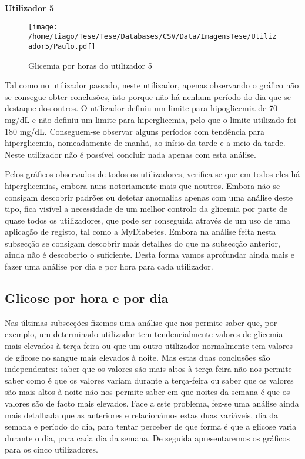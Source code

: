 \textbf{Utilizador 5}

\begin{figure}[H]
\centering
\texttt{[image: /home/tiago/Tese/Tese/Databases/CSV/Data/ImagensTese/Utilizador5/Paulo.pdf]}
\caption{Glicemia por horas do utilizador 5}
\end{figure}
Tal como no utilizador passado, neste utilizador, apenas observando o gráfico não se consegue obter conclusões, isto porque não há nenhum período do dia que se destaque dos outros. O utilizador definiu um limite para hipoglicemia de 70 mg/dL e não definiu um limite para hiperglicemia, pelo que o limite utilizado foi 180 mg/dL. Conseguem-se observar alguns períodos com tendência para hiperglicemia, nomeadamente de manhã, ao início da tarde e a meio da tarde. Neste utilizador não é possível concluir nada apenas com esta análise.\newline

Pelos gráficos observados de todos os utilizadores, verifica-se que em todos eles há hiperglicemias, embora nuns notoriamente mais que noutros. Embora não se consigam descobrir padrões ou detetar anomalias apenas com uma análise deste tipo, fica visível a necessidade de um melhor controlo da glicemia por parte de quase todos os utilizadores, que pode ser conseguida através de um uso de uma aplicação de registo, tal como a MyDiabetes. Embora na análise feita nesta subsecção se consigam descobrir mais detalhes do que na subsecção anterior, ainda não é descoberto o suficiente. Desta forma vamos aprofundar ainda mais e fazer uma análise por dia e por hora para cada utilizador.

\subsection{Glicose por hora e por dia}

Nas últimas subsecções fizemos uma análise que nos permite saber que, por exemplo, um determinado utilizador tem tendencialmente valores de glicemia mais elevados à terça-feira ou que um outro utilizador normalmente tem valores de glicose no sangue mais elevados à noite. Mas estas duas conclusões são independentes: saber que os valores são mais altos à terça-feira não nos permite saber como é que os valores variam durante a terça-feira ou saber que os valores são mais altos à noite não nos permite saber em que noites da semana é que os valores são de facto mais elevados. Face a este problema, fez-se uma análise ainda mais detalhada que as anteriores e relacionámos estas duas variáveis, dia da semana e período do dia, para tentar perceber de que forma é que a glicose varia durante o dia, para cada dia da semana. De seguida apresentaremos os gráficos para os cinco utilizadores. 

